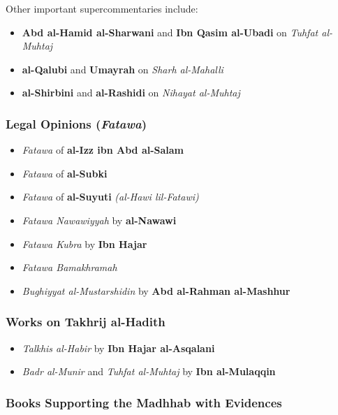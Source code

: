 \documentclass[
  a4paper,
  DIV=11,
  numbers=noendperiod]{scrartcl}
\providecommand{\tightlist}{%
  \setlength{\itemsep}{0pt}\setlength{\parskip}{0pt}}
\begin{document}
Other important supercommentaries include:

\begin{itemize}
\tightlist
\item
  \textbf{Abd al-Hamid al-Sharwani} and \textbf{Ibn Qasim al-Ubadi} on
  \emph{Tuhfat al-Muhtaj}
\item
  \textbf{al-Qalubi} and \textbf{Umayrah} on \emph{Sharh al-Mahalli}
\item
  \textbf{al-Shirbini} and \textbf{al-Rashidi} on \emph{Nihayat
  al-Muhtaj}
\end{itemize}

\subsubsection{\texorpdfstring{Legal Opinions
(\emph{Fatawa})}{Legal Opinions (Fatawa)}}\label{legal-opinions-fatawa}

\begin{itemize}
\tightlist
\item
  \emph{Fatawa} of \textbf{al-Izz ibn Abd al-Salam}
\item
  \emph{Fatawa} of \textbf{al-Subki}
\item
  \emph{Fatawa} of \textbf{al-Suyuti} \emph{(al-Hawi lil-Fatawi)}
\item
  \emph{Fatawa Nawawiyyah} by \textbf{al-Nawawi}
\item
  \emph{Fatawa Kubra} by \textbf{Ibn Hajar}
\item
  \emph{Fatawa Bamakhramah}
\item
  \emph{Bughiyyat al-Mustarshidin} by \textbf{Abd al-Rahman al-Mashhur}
\end{itemize}

\subsubsection{Works on Takhrij
al-Hadith}\label{works-on-takhrij-al-hadith}

\begin{itemize}
\tightlist
\item
  \emph{Talkhis al-Habir} by \textbf{Ibn Hajar al-Asqalani}
\item
  \emph{Badr al-Munir} and \emph{Tuhfat al-Muhtaj} by \textbf{Ibn
  al-Mulaqqin}
\end{itemize}

\subsubsection{Books Supporting the Madhhab with
Evidences}\label{books-supporting-the-madhhab-with-evidences}
\end{document}
